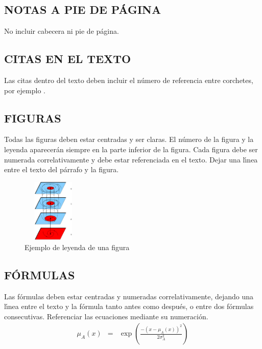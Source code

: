 \documentclass{article}
\begin{document}
\subsection{NOTAS A PIE DE P\'{A}GINA}

No incluir cabecera ni pie de p\'{a}gina.

\subsection{CITAS EN EL TEXTO}

Las citas dentro del texto deben incluir el n\'{u}mero de referencia entre
corchetes, por ejemplo \cite{bibli1}.

\subsection{FIGURAS}

Todas las figuras deben estar centradas y ser claras. El n\'{u}mero de la
figura y la leyenda aparecer\'{a}n siempre en la parte inferior de la
figura. Cada figura debe ser numerada correlativamente y debe estar
referenciada en el texto. Dejar una l\'{\i}nea entre el texto del p\'{a}rrafo
y la figura.

\begin{figure}[htbp]
\centerline{\includegraphics[width=3cm,height=3cm,angle=-90]{figure1}}
\caption{Ejemplo de leyenda de una figura} \label{fig:1}
\end{figure}



\subsection{F\'{O}RMULAS}

Las f\'{o}rmulas deben estar centradas y numeradas correlativamente, dejando
una l\'{\i}nea entre el texto y la f\'{o}rmula tanto antes como despu\'{e}s, o entre
dos f\'{o}rmulas consecutivas. Referenciar las ecuaciones mediante su numeraci\'{o}n.
\begin{eqnarray}
\mu_A(x) & = & \exp \left( \frac{-(x-\mu_A(x))^2}{2\sigma_A^2} \right)
\end{eqnarray}
\end{document}

